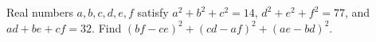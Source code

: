 Real numbers $a,b,c,d,e,f$ satisfy $a^2+b^2+c^2=14$, $d^2+e^2+f^2=77$, and $ad+be+cf=32$. Find $(bf-ce)^2+(cd-af)^2+(ae-bd)^2$.
